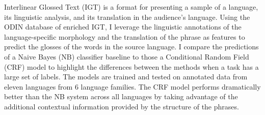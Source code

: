 Interlinear Glossed Text (IGT) is a format for presenting a sample of a language, its linguistic analysis, and its translation in the audience's language. Using the ODIN database of enriched IGT, I leverage the linguistic annotations of the language-specific morphology and the translation of the phrase as features to predict the glosses of the words in the source language. I compare the predictions of a Naive Bayes (NB) classifier baseline to those a Conditional Random Field (CRF) model to highlight the differences between the methods when a task has a large set of labels. The models are trained and tested on annotated data from eleven languages from 6 language families. The CRF model performs dramatically better than the NB system across all languages by taking advantage of the additional contextual information provided by the structure of the phrases.
